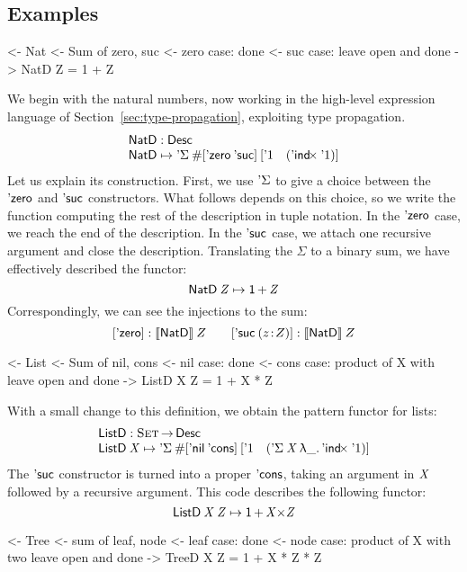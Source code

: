 \subsection{Examples}
\label{sec:desc-examples}

\begin{wstructure}
<- Nat
    <- Sum of zero, suc
    <- zero case: done
    <- suc case: leave open and done
    -> NatD Z = 1 + Z
\end{wstructure}

We begin with the natural numbers, now working in the high-level
expression language of Section~\ref{sec:type-propagation}, exploiting
type propagation.
%
\[\stk{
\NatD : \Desc \\
\NatD \mapsto \DSigma{\EnumT{\sqr{\NatZero\: \SYMBNatSuc }}}
                     {\sqr{ \DUnit \quad (\DIndx{\DUnit}) }}
}\]
%
Let us explain its construction. First, we use $\SYMBDSigma$ to
give a choice between the $\NatZero$ and $\SYMBNatSuc$ constructors.
What follows depends on this choice, so we write the function
computing the rest of the description in tuple notation.  In the
$\NatZero$ case, we reach the end of the description. In the
$\SYMBNatSuc$ case, we attach one recursive argument and close the
description. Translating the \(\Sigma\) to a binary sum, we have
effectively described the functor:
%
\[    \NatD\: \V{Z} \mapsto \Unit \mathop{\D{+}} \V{Z}    \]
Correspondingly, we can see the injections to the sum:
\[
\sqr{\NatZero}:\descop{\NatD}Z \qquad
\sqr{\NatSuc{(\Bhab{z}{Z})}}:\descop{\NatD}Z
\]

\begin{wstructure}
<- List
    <- Sum of nil, cons
    <- nil case: done
    <- cons case: product of X with leave open and done
    -> ListD X Z = 1 + X * Z
\end{wstructure}

With a small change to this definition, we obtain the pattern functor
for lists:
%
\[\stk{
\ListD : \Set \To \Desc \\
\ListD \: \V{X} \mapsto
 \DSigma{\EnumT{\sqr{ \ListNil\: \SYMBListCons }}}
         {\sqr{ \DUnit \quad (\DSigma{\V{X}}{\LAM{\_} \DIndx{\DUnit}}) }}
}\]
%
The $\SYMBNatSuc$ constructor is turned into a proper
$\SYMBListCons$, taking an argument in $\V{X}$ followed by a
recursive argument. This code describes the following functor:
%
\[    \ListD\: \V{X}\: \V{Z} \mapsto \Unit \mathop{\D{+}} \V{X} \D{\ensuremath{\times}} \V{Z}     \]

\begin{wstructure}
<- Tree
    <- sum of leaf, node
    <- leaf case: done
    <- node case: product of X with two leave open and done
    -> TreeD X Z = 1 + X * Z * Z
\end{wstructure}


